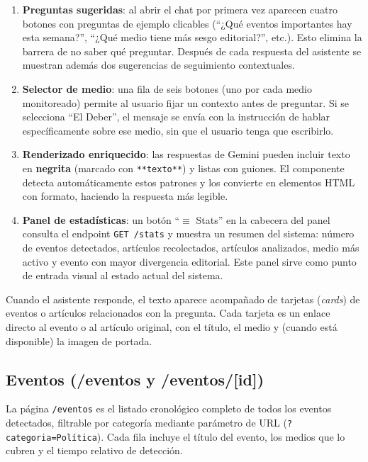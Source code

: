 \documentclass[12pt,a4paper]{article}
\begin{document}
\begin{enumerate}[nosep]
  \item \textbf{Preguntas sugeridas}: al abrir el chat por primera vez aparecen cuatro botones con preguntas de ejemplo clicables (``¿Qué eventos importantes hay esta semana?'', ``¿Qué medio tiene más sesgo editorial?'', etc.). Esto elimina la barrera de no saber qué preguntar. Después de cada respuesta del asistente se muestran además dos sugerencias de seguimiento contextuales.

  \item \textbf{Selector de medio}: una fila de seis botones (uno por cada medio monitoreado) permite al usuario fijar un contexto antes de preguntar. Si se selecciona ``El Deber'', el mensaje se envía con la instrucción de hablar específicamente sobre ese medio, sin que el usuario tenga que escribirlo.

  \item \textbf{Renderizado enriquecido}: las respuestas de Gemini pueden incluir texto en \textbf{negrita} (marcado con \texttt{**texto**}) y listas con guiones. El componente detecta automáticamente estos patrones y los convierte en elementos HTML con formato, haciendo la respuesta más legible.

  \item \textbf{Panel de estadísticas}: un botón ``$\equiv$ Stats'' en la cabecera del panel consulta el endpoint \texttt{GET /stats} y muestra un resumen del sistema: número de eventos detectados, artículos recolectados, artículos analizados, medio más activo y evento con mayor divergencia editorial. Este panel sirve como punto de entrada visual al estado actual del sistema.
\end{enumerate}

Cuando el asistente responde, el texto aparece acompañado de tarjetas (\textit{cards}) de eventos o artículos relacionados con la pregunta. Cada tarjeta es un enlace directo al evento o al artículo original, con el título, el medio y (cuando está disponible) la imagen de portada.

\subsection{Eventos (/eventos y /eventos/[id])}

La página \texttt{/eventos} es el listado cronológico completo de todos los eventos detectados, filtrable por categoría mediante parámetro de URL (\texttt{?categoria=Política}). Cada fila incluye el título del evento, los medios que lo cubren y el tiempo relativo de detección.
\end{document}
